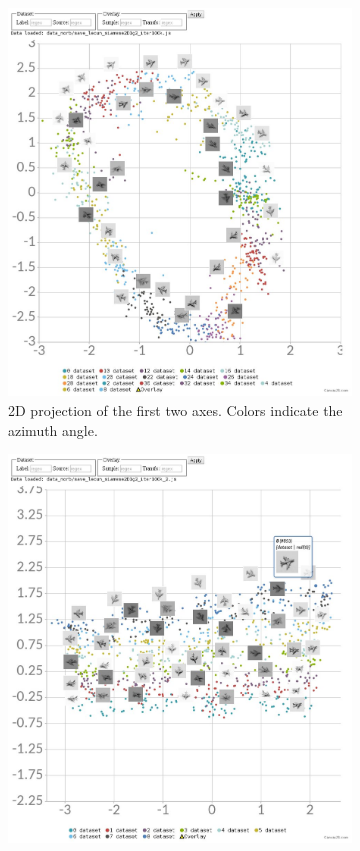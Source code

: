\documentclass[a4paper,12pt]{report}
\begin{document}
\begin{figure}[h]
    \centering
    \begin{subfigure}{0.45\textwidth}
        \centering
        \includegraphics[width=\textwidth]{thesis_figures/norb_cl2d.jpg}
        \caption{2D projection of the first two axes. Colors indicate the azimuth angle.}
    \end{subfigure}
    \begin{subfigure}{0.45\textwidth}
        \centering
        \includegraphics[width=\textwidth]{thesis_figures/norb_cl2d2.jpg}

\end{subfigure}
\end{figure}
\end{document}
